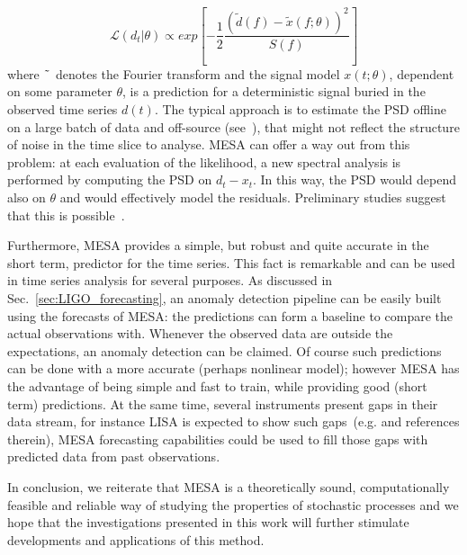 \documentclass[twocolumn,showpacs,preprintnumbers,nofootinbib,prd,
superscriptaddress,10pt]{revtex4-1}
\begin{document}
\begin{equation}
	\mathcal{L}(d_t | \theta) \propto exp\left[ -\frac{1}{2} \frac{(\tilde{d}(f)- \tilde{x}(f;\theta))^2}{S(f)} \right]
\end{equation}
where $\tilde{\hphantom{a}}$ denotes the Fourier transform and the signal model $x(t;\theta)$, dependent on some parameter $\theta$, is a prediction for a deterministic signal buried in the observed time series $d(t)$. The typical approach is to estimate the PSD offline on a large batch of data and off-source (see~\cite{lalinference}), that might not reflect the structure of noise in the time slice to analyse. MESA can offer a way out from this problem: at each evaluation of the likelihood, a new spectral analysis is performed by computing the PSD on $d_t-x_t$.
In this way, the PSD would depend also on $\theta$ and would effectively model the residuals. Preliminary studies suggest that this is possible~\cite{martini_thesis}.

Furthermore, MESA provides a simple, but robust and quite accurate in the short term, predictor for the time series. This fact is remarkable and can be used in time series analysis for several purposes. As discussed in Sec.~\ref{sec:LIGO_forecasting}, an anomaly detection pipeline can be easily built using the forecasts of MESA: the predictions can form a baseline to compare the actual observations with. Whenever the observed data are outside the expectations, an anomaly detection can be claimed. Of course such predictions can be done with a more accurate (perhaps nonlinear model); however MESA has the advantage of being simple and fast to train, while providing good (short term) predictions. At the same time, several instruments present gaps in their data stream, for instance LISA is expected to show such gaps~(e.g. \cite{lisa_gaps} and references therein), MESA forecasting capabilities could be used to fill those gaps with predicted data from past observations.

In conclusion, we reiterate that MESA is a theoretically sound, computationally feasible and reliable way of studying the properties of stochastic processes and we hope that the investigations presented in this work will further stimulate developments and applications of this method.
\end{document}

